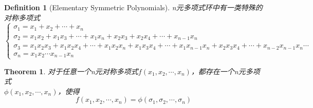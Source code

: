 \documentclass[onecolumn]{ctexart}
\newtheorem{definition}{Definition}
\newtheorem{theorem}{Theorem}
\begin{document}
\begin{definition}[Elementary Symmetric Polynomials]
  n元多项式环中有一类特殊的对称多项式
  \begin{equation}
    \begin{cases}
      \sigma_1 = x_1 + x_2 + \cdots + x_n \\
      \sigma_2 = x_1x_2 + x_1x_3 + \cdots + x_1x_n + x_2x_3 + x_2x_4 + \cdots + x_{n-1}x_n \\
      \sigma_3 = x_1x_2x_3 + x_1x_2x_4 + \cdots + x_1x_2x_n + x_1x_3x_4 + \cdots + x_1x_{n-1}x_n + x_2x_3x_4 + \cdots + x_{n-2}x_{n-1}x_n
      \cdots \\
      \sigma_n = x_1x_2 \cdots x_{n-1}x_n
    \end{cases}
  \end{equation}
\end{definition}

\begin{theorem}
  对于任意一个n元对称多项式$f(x_1, x_2, \cdots, x_n)$，都存在一个n元多项式 \\ $\phi(x_1, x_2, \cdots, x_n)$，使得
  \[
    f(x_1, x_2, \cdots, x_n) = \phi(\sigma_1, \sigma_2, \cdots, \sigma_n)
  \]
\end{theorem}
\end{document}
